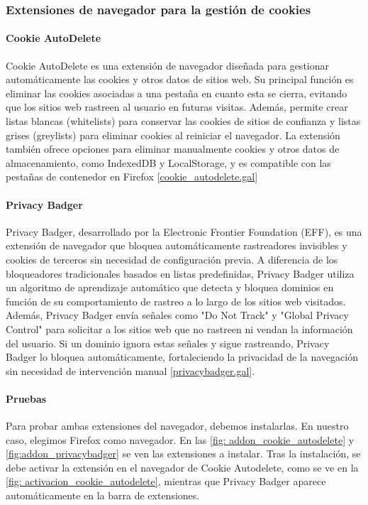 \subsubsection{Extensiones de navegador para la gestión de cookies}

\paragraph{Cookie AutoDelete}

Cookie AutoDelete es una extensión de navegador diseñada para gestionar automáticamente las cookies y otros datos de sitios web. Su principal función es eliminar las cookies asociadas a una pestaña en cuanto esta se cierra, evitando que los sitios web rastreen al usuario en futuras visitas. Además, permite crear listas blancas (whitelists) para conservar las cookies de sitios de confianza y listas grises (greylists) para eliminar cookies al reiniciar el navegador. La extensión también ofrece opciones para eliminar manualmente cookies y otros datos de almacenamiento, como IndexedDB y LocalStorage, y es compatible con las pestañas de contenedor en Firefox [\url{cookie_autodelete.gal}]

\paragraph{Privacy Badger}

Privacy Badger, desarrollado por la Electronic Frontier Foundation (EFF), es una extensión de navegador que bloquea automáticamente rastreadores invisibles y cookies de terceros sin necesidad de configuración previa. A diferencia de los bloqueadores tradicionales basados en listas predefinidas, Privacy Badger utiliza un algoritmo de aprendizaje automático que detecta y bloquea dominios en función de su comportamiento de rastreo a lo largo de los sitios web visitados. Además, Privacy Badger envía señales como "Do Not Track" y "Global Privacy Control" para solicitar a los sitios web que no rastreen ni vendan la información del usuario. Si un dominio ignora estas señales y sigue rastreando, Privacy Badger lo bloquea automáticamente, fortaleciendo la privacidad de la navegación sin necesidad de intervención manual [\url{privacybadger.gal}]. 

\paragraph{Pruebas}

Para probar ambas extensiones del navegador, debemos instalarlas. En nuestro caso, elegimos Firefox como navegador. En las \ref{fig: addon_cookie_autodelete} y \ref{fig:addon_privacybadger} se ven las extensiones a instalar. Tras la instalación, se debe activar la extensión en el navegador de Cookie Autodelete, como se ve en la \ref{fig: activacion_cookie_autodelete}, mientras que Privacy Badger aparece automáticamente en la barra de extensiones. 

